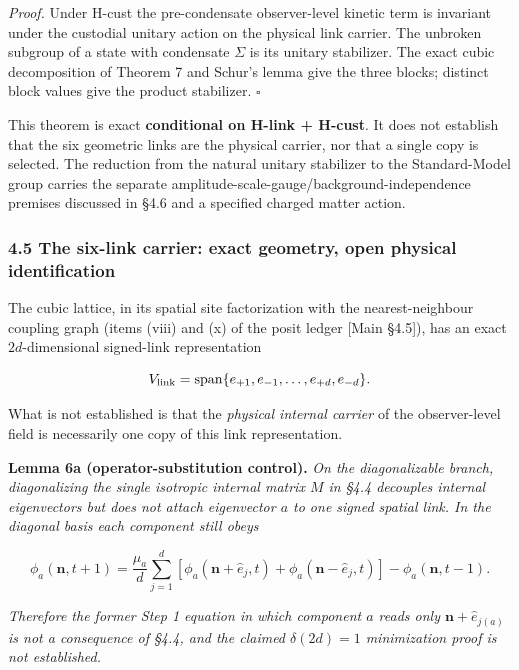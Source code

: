 \documentclass[
]{article}
\begin{document}
\emph{Proof.} Under H-cust the pre-condensate observer-level kinetic
term is invariant under the custodial unitary action on the physical
link carrier. The unbroken subgroup of a state with condensate
\(\Sigma\) is its unitary stabilizer. The exact cubic decomposition of
Theorem 7 and Schur's lemma give the three blocks; distinct block values
give the product stabilizer. \(\square\)

This theorem is exact \textbf{conditional on H-link + H-cust}. It does
not establish that the six geometric links are the physical carrier, nor
that a single copy is selected. The reduction from the natural unitary
stabilizer to the Standard-Model group carries the separate
amplitude-scale-gauge/background-independence premises discussed in §4.6
and a specified charged matter action.

\hypertarget{the-six-link-carrier-exact-geometry-open-physical-identification}{%
\subsubsection{4.5 The six-link carrier: exact geometry, open physical
identification}\label{the-six-link-carrier-exact-geometry-open-physical-identification}}

The cubic lattice, in its spatial site factorization with the
nearest-neighbour coupling graph (items (viii) and (x) of the posit
ledger {[}Main §4.5{]}), has an exact \(2d\)-dimensional signed-link
representation

\[V_{\rm link}=\operatorname{span}\{e_{+1},e_{-1},\ldots,e_{+d},e_{-d}\}.\]

What is not established is that the \emph{physical internal carrier} of
the observer-level field is necessarily one copy of this link
representation.

\textbf{Lemma 6a (operator-substitution control).} \emph{On the
diagonalizable branch, diagonalizing the single isotropic internal
matrix \(M\) in §4.4 decouples internal eigenvectors but does not attach
eigenvector \(a\) to one signed spatial link. In the diagonal basis each
component still obeys}

\[\phi_a(\mathbf n,t+1)=\frac{\mu_a}{d}\sum_{j=1}^d[\phi_a(\mathbf n+\hat e_j,t)+\phi_a(\mathbf n-\hat e_j,t)]-\phi_a(\mathbf n,t-1).\]

\emph{Therefore the former Step 1 equation in which component \(a\)
reads only \(\mathbf n+\hat e_{j(a)}\) is not a consequence of §4.4, and
the claimed \(\delta(2d)=1\) minimization proof is not established.}
\end{document}
